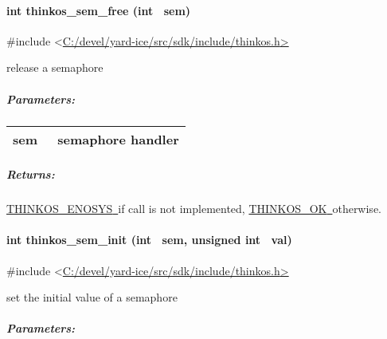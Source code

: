 {\paragraph{\texorpdfstring{{int thinkos\_sem\_free (int
~sem)}}{int thinkos\_sem\_free (int ~sem)}}\label{int-thinkos_sem_free-int-sem}

{}

{\#include
\textless{}}{\protect\hyperlink{h.pkwqa1}{C:/devel/yard-ice/src/sdk/include/thinkos.h}}{\protect\hyperlink{h.pkwqa1}{\textgreater{}}}

{release a semaphore }

{}

\subparagraph{\texorpdfstring{{Parameters:}}{Parameters:}}\label{parameters-20}

\protect\hypertarget{t.42f0ad63e27678006eae2b4c683934157041a4d7}{}{}\protect\hypertarget{t.20}{}{}

\begin{longtable}[]{@{}ll@{}}
\toprule
\begin{minipage}[t]{0.47\columnwidth}\raggedright\strut
{sem}{~}\strut
\end{minipage} & \begin{minipage}[t]{0.47\columnwidth}\raggedright\strut
{semaphore handler }\strut
\end{minipage}\tabularnewline
\bottomrule
\end{longtable}

\subparagraph{\texorpdfstring{{Returns:}}{Returns:}}\label{returns-24}

{\protect\hyperlink{h.3s49zyc}{THINKOS\_ENOSYS}}{\protect\hyperlink{h.3s49zyc}{~}}{if
call is not implemented,
}{\protect\hyperlink{h.2fk6b3p}{THINKOS\_OK}}{\protect\hyperlink{h.2fk6b3p}{~}}{otherwise.
}

\paragraph{\texorpdfstring{{int thinkos\_sem\_init (int ~sem, unsigned
int
~val)}}{int thinkos\_sem\_init (int ~sem, unsigned int ~val)}}\label{int-thinkos_sem_init-int-sem-unsigned-int-val}

{}

{\#include
\textless{}}{\protect\hyperlink{h.pkwqa1}{C:/devel/yard-ice/src/sdk/include/thinkos.h}}{\protect\hyperlink{h.pkwqa1}{\textgreater{}}}

{set the initial value of a semaphore }

{}

\subparagraph{\texorpdfstring{{Parameters:}}{Parameters:}}\label{parameters-21}

}
